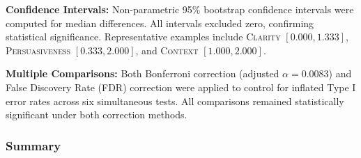 \textbf{Confidence Intervals:} Non-parametric 95\% bootstrap confidence intervals were computed for median differences. All intervals excluded zero, confirming statistical significance. Representative examples include \textsc{Clarity} $[0.000, 1.333]$, \textsc{Persuasiveness} $[0.333, 2.000]$, and \textsc{Context} $[1.000, 2.000]$.

\textbf{Multiple Comparisons:} Both Bonferroni correction (adjusted $\alpha = 0.0083$) and False Discovery Rate (FDR) correction were applied to control for inflated Type I error rates across six simultaneous tests. All comparisons remained statistically significant under both correction methods.

\subsubsection{Summary}


